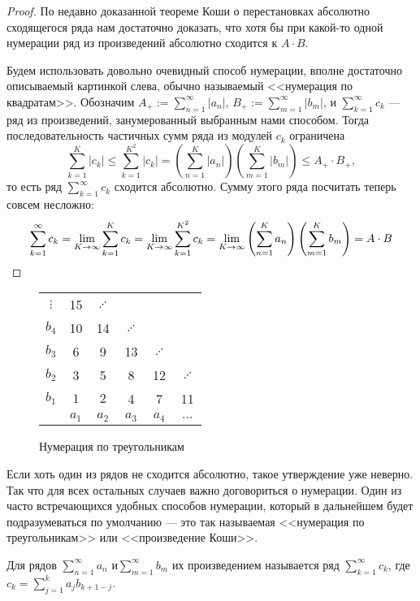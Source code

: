 \documentclass[a4paper, 12pt]{article}
\begin{document}
	\begin{proof} По недавно доказанной теореме Коши о перестановках абсолютно сходящегося ряда нам достаточно доказать, что хотя бы при какой-то одной нумерации ряд из произведений абсолютно сходится к $A\cdot B$.	
		
		Будем использовать довольно очевидный способ нумерации, вполне достаточно описываемый картинкой слева, обычно называемый <<нумерация по квадратам>>. 	Обозначим $A_+ := \sum\limits_{n=1}^{\infty}|a_n|$,  $B_+ := \sum\limits_{m=1}^{\infty}|b_m|$, и $\sum\limits_{k=1}^{\infty}c_k$ --- ряд из произведений, занумерованный выбранным нами способом. Тогда последовательность частичных сумм ряда из модулей $c_k$ ограничена \\
		\[
		\sum\limits_{k=1}^{K}|c_k| \leq \sum\limits_{k=1}^{K^2}|c_k| = \left(\sum\limits_{n=1}^{K}|a_n|\right)\left(\sum\limits_{m=1}^{K}|b_m|\right) \leq A_+\cdot B_+,
		\] 
		то есть ряд $\sum\limits_{k=1}^{\infty}c_k$ сходится абсолютно. 
		Сумму этого ряда посчитать теперь совсем несложно:
		\[\sum\limits_{k=1}^{\infty}c_k = \lim\limits_{K\rightarrow \infty} \sum\limits_{k=1}^{K}c_k = \lim\limits_{K\rightarrow \infty} \sum\limits_{k=1}^{K^2}c_k = \lim\limits_{K\rightarrow \infty} \left(\sum\limits_{n=1}^{K}a_n\right)\left(\sum\limits_{m=1}^{K}b_m\right)=A\cdot B
		\]
		\end{proof}
		
	\begin{wrapfigure}{r}{0.3\linewidth}
		\begin{tabular}[t]{c|ccccc}
			$\vdots$ &15& $\iddots$& & & \\
			$b_4$ & 10 & 14&$\iddots$ &&  \\
			$b_3$ & 6 & 9 & 13&$\iddots$ &   \\
			$b_2$ & 3 & 5& 8 & 12&$\iddots$ \\
			$b_1$ & $1$ & $2$ &4&7&11\\
			\hline
			& $a_1$ & $a_2$ & $a_3$ & $a_4$ &$\dots$ \\
		\end{tabular}
		\caption{Нумерация по треугольникам}
		\vspace{-60pt}
	\end{wrapfigure}
	Если хоть один из рядов не сходится абсолютно, такое утверждение уже неверно. Так что для всех остальных случаев важно договориться о нумерации. Один из часто встречающихся удобных способов нумерации, который в дальнейшем будет подразумеваться по умолчанию --- это так называемая <<нумерация по треугольникам>> или <<произведение Коши>>.
	\begin{Def}
		Для рядов $\sum\limits_{n=1}^{\infty}a_n$ и$ \sum\limits_{m=1}^{\infty}b_m$ их произведением называется ряд  $\sum\limits_{k=1}^{\infty}c_k$, где $c_k =\sum\limits_{j=1}^{k}a_jb_{k+1-j}$.
	\end{Def}
	
\end{document}
